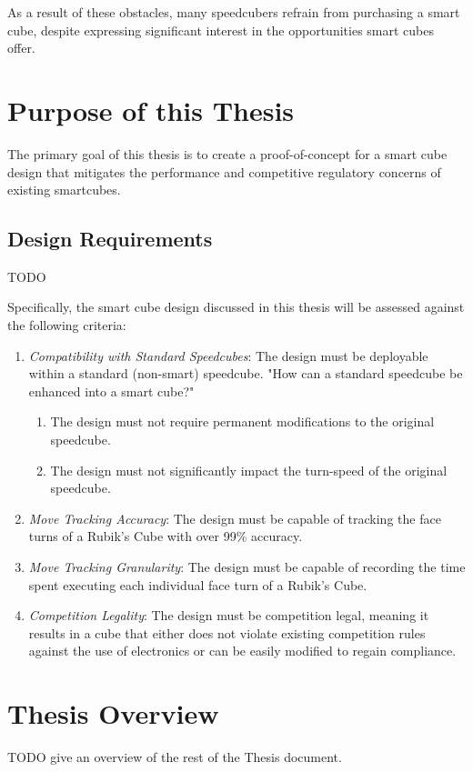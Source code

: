 As a result of these obstacles, many speedcubers refrain from purchasing a smart cube, despite expressing significant interest in the opportunities smart cubes offer.

\section{Purpose of this Thesis}
The primary goal of this thesis is to create a proof-of-concept for a smart cube design that mitigates the performance and competitive regulatory concerns of existing smartcubes.

\subsection{Design Requirements}
TODO 

Specifically, the smart cube design discussed in this thesis will be assessed against the following criteria:
\begin{enumerate}
    \item \emph{Compatibility with Standard Speedcubes}: The design must be deployable within a standard (non-smart) speedcube. "How can a standard speedcube be enhanced into a smart cube?"
        \begin{enumerate} 
            \item The design must not require permanent modifications to the original speedcube.
            \item The design must not significantly impact the turn-speed of the original speedcube.
        \end{enumerate}
    \item \emph{Move Tracking Accuracy}: The design must be capable of tracking the face turns of a Rubik's Cube with over 99\% accuracy. 
    \item \emph{Move Tracking Granularity}: The design must be capable of recording the time spent executing each individual face turn of a Rubik's Cube.
    \item \emph{Competition Legality}: The design must be competition legal, meaning it results in a cube that either does not violate existing competition rules against the use of electronics or can be easily modified to regain compliance.
\end{enumerate}

\section{Thesis Overview}
TODO give an overview of the rest of the Thesis document.